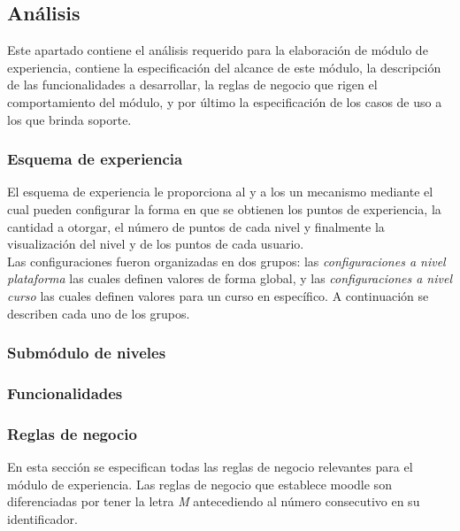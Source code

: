 
\subsection{Análisis}

 Este apartado contiene el análisis requerido para la elaboración de módulo de experiencia,
 contiene la especificación del alcance de este módulo, la descripción de las funcionalidades
 a desarrollar, la reglas de negocio que rigen el comportamiento del módulo, y por último la
 especificación de los casos de uso a los que brinda soporte.

\subsubsection{Esquema de experiencia}

 El esquema de experiencia le proporciona al  y a los  un mecanismo mediante el cual pueden configurar la forma en que se obtienen los puntos
 de experiencia, la cantidad a otorgar, el número de puntos de cada nivel y finalmente la
 visualización del nivel y de los puntos de cada usuario.\\

 \noindent
 Las configuraciones fueron organizadas en dos grupos: las {\it configuraciones a
 nivel plataforma} las cuales definen valores de forma global, y las {\it configuraciones a nivel
 curso} las cuales definen valores para un curso en específico. A continuación se describen cada
 uno de los grupos.\\

\subsubsection{Submódulo de niveles}
\subsubsection{Funcionalidades}

\subsubsection{Reglas de negocio} %

 En esta sección se especifican todas las reglas de negocio relevantes para el módulo de
 experiencia. Las reglas de negocio que establece moodle son diferenciadas por tener la letra {\it M}
 antecediendo al número consecutivo en su identificador.

